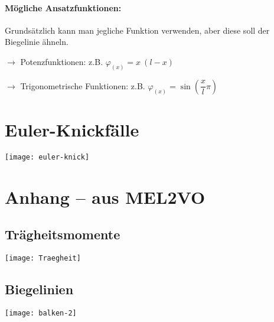\paragraph{	Mögliche Ansatzfunktionen:} \quad 

	Grundsätzlich kann man jegliche Funktion verwenden, aber diese soll der Biegelinie ähneln.
	
	$\rightarrow$ Potenzfunktionen: z.B. $ \varphi_{(x)}=x\ (l-x) $

	$\rightarrow$ Trigonometrische Funktionen: z.B. $ \varphi_{(x)}=\sin{\left(\dfrac{x}{l}\pi\right)} $
	
\section{Euler-Knickfälle}
	\begin{center}
		\texttt{[image: euler-knick]}
	\end{center}

\section{Anhang -- aus MEL2VO}
\subsection{Trägheitsmomente}
	\begin{center}
		\texttt{[image: Traegheit]}
	\end{center}
	
\subsection{Biegelinien}
	
	\texttt{[image: balken-2]}